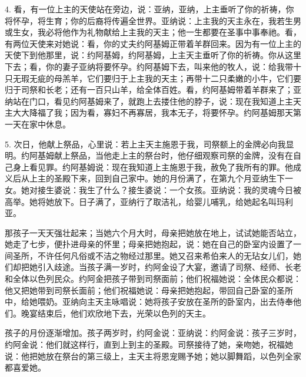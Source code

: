 4. 看，有一位上主的天使站在旁边，说：亚纳，亚纳，上主垂听了你的祈祷，你将怀孕，将生育；你的后裔将传遍全世界。亚纳说：上主我的天主永在，我若生男或生女，我必将他作为礼物献给上主我的天主；他一生都要在圣事中事奉祂。看，有两位天使来对她说：看，你的丈夫约阿基姆正带着羊群回来。因为有一位上主的天使下到他那里，说：约阿基姆，约阿基姆，上主天主垂听了你的祈祷。你从这里下去；看，你的妻子亚纳将要怀孕。约阿基姆下去，叫来他的牧人，说：给我带十只无瑕无疵的母羔羊，它们要归于上主我的天主；再带十二只柔嫩的小牛，它们要归于司祭和长老；还有一百只山羊，给全体百姓。看，约阿基姆带着羊群来了；亚纳站在门口，看见约阿基姆来了，就跑上去搂住他的脖子，说：现在我知道上主天主大大降福了我；因为看，寡妇不再寡居，我本无子，将要怀孕。约阿基姆那天第一天在家中休息。\par

5. 次日，他献上祭品，心里说：若上主天主施恩于我，司祭额上的金牌必向我显明。约阿基姆献上祭品，当他走上主的祭台时，他仔细观察司祭的金牌，没有在自己身上看见罪。约阿基姆说：现在我知道上主施恩于我，赦免了我所有的罪。他成义后从上主的圣殿下来，回到自己家中。她的月份满了，在第九个月亚纳生下一女。她对接生婆说：我生了什么？接生婆说：一个女孩。亚纳说：我的灵魂今日被高举。她将她放下。日子满了，亚纳行了取洁礼，给婴儿哺乳，给她起名叫玛利亚。\par

那孩子一天天强壮起来；当她六个月大时，母亲把她放在地上，试试她能否站立，她走了七步，便扑进母亲的怀里；母亲把她抱起，说：她在自己的卧室内设置了一间圣所，不许任何凡俗或不洁之物经过那里。她又召来希伯来人的无玷女儿们，她们却把她引入歧途。当孩子满一岁时，约阿金设了大宴，邀请了司祭、经师、长老和全体以色列民众。约阿金把孩子带到司祭面前；他们祝福她说：全体民众都说：他又把她带到司祭长面前；他们祝福她说：母亲把她抱起，带回自己卧室的圣所中，给她喂奶。亚纳向主天主咏唱说：她将孩子安放在圣所的卧室内，出去侍奉他们。晚宴结束后，他们欢欣地下去，光荣以色列的天主。\par

孩子的月份逐渐增加。孩子两岁时，约阿金说：亚纳说：约阿金说：孩子三岁时，约阿金说：他们就这样行，直到上到主的圣殿。司祭接待了她，亲吻她，祝福她说：他把她放在祭台的第三级上，主天主将恩宠赐予她；她以脚舞蹈，以色列全家都喜爱她。\par

